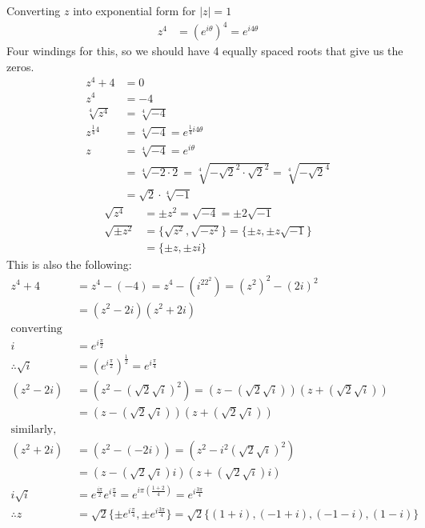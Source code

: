 \documentclass{article}
\begin{document}
Converting $z$ into exponential form for $|z| = 1$
 \begin{align*}
 z^4 &= (e^{i\theta})^4 = e^{i4\theta}
 \end{align*}
 Four windings for this, so we should have 4 equally spaced roots that give us the zeros.
 \begin{align*}
   z^4+4 &= 0\\
   z^4 &= -4\\
   \sqrt[4]{z^4} &= \sqrt[4]{-4}\\
   z^{\frac{1}{4}4} &= \sqrt[4]{-4} = e^{\frac{1}{4}i4\theta}\\
   z &= \sqrt[4]{-4} = e^{i\theta}\\
         &= \sqrt[4]{-2\cdot 2} = \sqrt[4]{-\sqrt{2}^2\cdot \sqrt{2}^2} = \sqrt[4]{-\sqrt{2}^4}\\
         &= \sqrt{2}\cdot \sqrt[4]{-1} 
 \end{align*}
 \begin{align*}
   \sqrt{z^4} &= \pm z^2 = \sqrt{-4} = \pm 2\sqrt{-1}\\
   \sqrt{\pm z^2} &= \{\sqrt{z^2}, \sqrt{-z^2}\} = \{\pm z, \pm z\sqrt{-1}\}\\
   &= \{\pm z, \pm zi\}
 \end{align*}
 This is also the following:
 \begin{align*}
   z^4 + 4 &= z^4 - (-4) = z^4 - (i^22^2) = (z^2)^2 - (2i)^2\\
           &=(z^2-2i)(z^2+2i)\\
   \text{converting to exponential}\\
   i &= e^{i\frac{\pi}{2}}\\
   \therefore \sqrt{i} &= (e^{i\frac{\pi}{2}})^{\frac{1}{2}} = e^{i\frac{\pi}{4}}\\
   (z^2-2i) &= (z^2-(\sqrt{2}\sqrt{i})^2) = (z-(\sqrt{2}\sqrt{i}))(z+(\sqrt{2}\sqrt{i}))\\
   &= \boxed{(z-(\sqrt{2}\sqrt{i}))(z+(\sqrt{2}\sqrt{i}))}\\
   \text{similarly, for the positive side}\\
   (z^2+2i) &= (z^2-(-2i)) = (z^2-i^2(\sqrt{2}\sqrt{i})^2)\\
           &= \boxed{(z - (\sqrt{2}\sqrt{i})i)(z+(\sqrt{2}\sqrt{i})i)} \\
   i\sqrt{i} &= e^{\frac{i\pi}{2}}e^{i\frac{\pi}{4}} = e^{i\pi(\frac{1+2}{4})} = e^{i\frac{3\pi}{4}}\\
   \therefore z &=\sqrt{2}\{\pm e^{i\frac{\pi}{4}}, \pm e^{i\frac{3\pi}{4}}\} = \sqrt{2}\{(1+i),(-1+i),(-1-i),(1-i)\}
 \end{align*}
 
\end{document}
